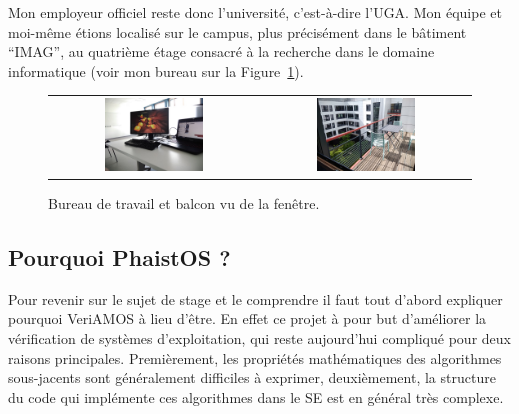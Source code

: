 Mon employeur officiel reste donc l'université, c'est-à-dire l'UGA. Mon équipe 
et moi-même étions localisé sur le campus, plus précisément dans le bâtiment 
``IMAG'', au quatrième étage consacré à la recherche dans le domaine 
informatique (voir mon bureau sur la Figure~\ref{fig:imag}).

\begin{figure}[h!t] \centering
    \begin{tabular}{@{}c@{\hspace{5pt}}c@{}}
    \includegraphics[width=0.49\textwidth]{images/desk} & \includegraphics[width=0.49\textwidth]{images/balcony}
    \end{tabular}
    \caption{Bureau de travail et balcon vu de la fenêtre.}
    \label{fig:imag}
\end{figure}

\subsection{Pourquoi PhaistOS ?}

Pour revenir sur le sujet de stage et le comprendre il faut tout d'abord 
expliquer pourquoi VeriAMOS à lieu d'être. En effet ce projet à pour but 
d'améliorer la vérification de systèmes d'exploitation, qui reste aujourd'hui 
compliqué pour deux raisons principales. Premièrement, les propriétés 
mathématiques des algorithmes sous-jacents sont généralement difficiles à 
exprimer, deuxièmement, la structure du code qui implémente ces algorithmes 
dans le SE est en général très complexe. 

